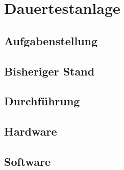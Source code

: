 \section{Dauertestanlage}
\subsection{Aufgabenstellung}
\subsection{Bisheriger Stand}
\subsection{Durchführung}
\subsection{Hardware}
\subsection{Software}

